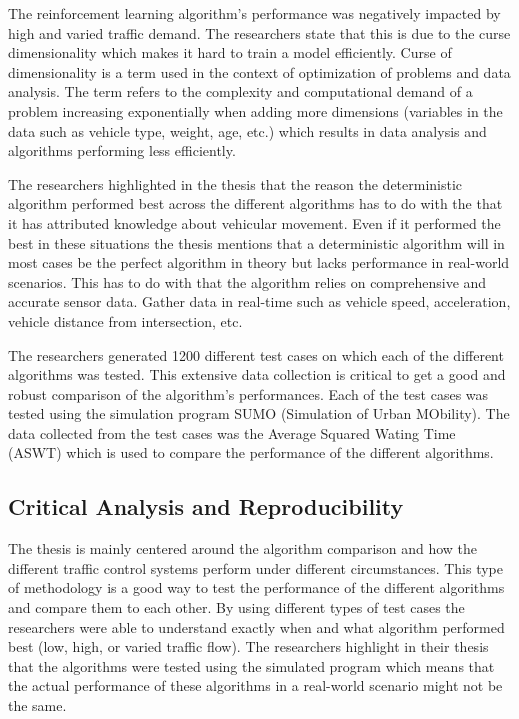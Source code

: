 \documentclass[10pt, titlepage]{article}
\begin{document}
The reinforcement learning algorithm's performance was negatively impacted by high and varied traffic demand. The researchers state that this is due to the curse dimensionality which makes it hard to train a model efficiently. Curse of dimensionality is a term used in the context of optimization of problems and data analysis. The term refers to the complexity and computational demand of a problem increasing exponentially when adding more dimensions (variables in the data such as vehicle type, weight, age, etc.) which results in data analysis and algorithms performing less efficiently.

The researchers highlighted in the thesis that the reason the deterministic algorithm performed best across the different algorithms has to do with the that it has attributed knowledge about vehicular movement. Even if it performed the best in these situations the thesis mentions that a deterministic algorithm will in most cases be the perfect algorithm in theory but lacks performance in real-world scenarios. This has to do with that the algorithm relies on comprehensive and accurate sensor data. Gather data in real-time such as vehicle speed, acceleration, vehicle distance from intersection, etc.

The researchers generated 1200 different test cases on which each of the different algorithms was tested. This extensive data collection is critical to get a good and robust comparison of the algorithm's performances. Each of the test cases was tested using the simulation program SUMO (Simulation of Urban MObility). The data collected from the test cases was the Average Squared Wating Time (ASWT) which is used to compare the performance of the different algorithms.

\subsection{Critical Analysis and Reproducibility}
The thesis is mainly centered around the algorithm comparison and how the different traffic control systems perform under different circumstances. This type of methodology is a good way to test the performance of the different algorithms and compare them to each other. By using different types of test cases the researchers were able to understand exactly when and what algorithm performed best (low, high, or varied traffic flow). The researchers highlight in their thesis that the algorithms were tested using the simulated program which means that the actual performance of these algorithms in a real-world scenario might not be the same.
\end{document}

